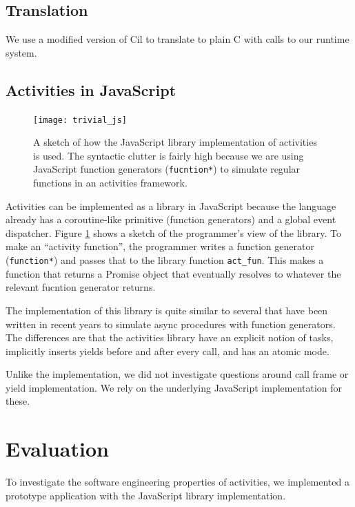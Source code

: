 \documentclass[9pt,preprint]{sigplanconf}
\begin{document}
\subsection{Translation}

We use a modified version of Cil \cite{Necula2002} to translate \charcoal{} to plain C with calls to our runtime system.

\subsection{Activities in JavaScript}

\begin{figure}
\texttt{[image: trivial\_js]}
\caption{A sketch of how the JavaScript library implementation of activities is used.
The syntactic clutter is fairly high because we are using JavaScript function generators (\texttt{fucntion*}) to simulate regular functions in an activities framework.}
\label{fig:trivial_js}
\end{figure}

Activities can be implemented as a library in JavaScript because the language already has a coroutine-like primitive (function generators) and a global event dispatcher.
Figure \ref{fig:trivial_js} shows a sketch of the programmer's view of the library.
To make an ``activity function'', the programmer writes a function generator (\texttt{function*}) and passes that to the library function \texttt{act\_fun}.
This makes a function that returns a Promise object that eventually resolves to whatever the relevant fucntion generator returns.

The implementation of this library is quite similar to several that have been written in recent years to simulate async procedures with function generators.
The differences are that the activities library have an explicit notion of tasks, implicitly inserts yields before and after every call, and has an atomic mode.

Unlike the \charcoal{} implementation, we did not investigate questions around call frame or yield implementation.
We rely on the underlying JavaScript implementation for these.

\section{Evaluation}

To investigate the software engineering properties of activities, we implemented a prototype application with the JavaScript library implementation.
\end{document}
